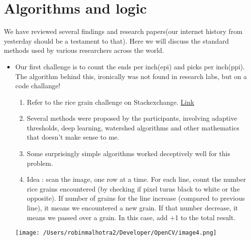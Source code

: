 \documentclass[DIV=calc, paper=a4, fontsize=12pt, twocolumn]{scrartcl}	 %
\begin{document}
\section{Algorithms and logic}

We have reviewed several findings and research papers(our internet history from yesterday should be a testament to that). Here we will discuss the standard methods used by various researchers across the world.
\begin{itemize}

\item Our first challenge is to count the ends per inch(epi) and picks per inch(ppi). The algorithm behind this, ironically was not found in research labs, but on a code challange!
\begin{enumerate}	
\item Refer to the rice grain challenge on Stackexchange. \href{http://codegolf.stackexchange.com/questions/40831/counting-grains-of-rice}{Link}
\item Several methods were proposed by the participants, involving adaptive thresholds, deep learning, watershed algorithms and other mathematics that doesn't make sense to me.
\item Some surprisingly simple algorithms worked deceptively well for this problem. 
\item Idea : scan the image, one row at a time. For each line, count the number rice grains encountered (by checking if pixel turns black to white or the opposite). If number of grains for the line increase (compared to previous line), it means we encountered a new grain. If that number decrease, it means we passed over a grain. In this case, add +1 to the total result.
\end{enumerate}
\texttt{[image: /Users/robinmalhotra2/Developer/OpenCV/image4.png]}



\end{itemize}
\end{document}
